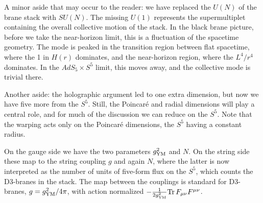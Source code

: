 \documentclass[12pt]{article}
\begin{document}
A minor aside that may occur to the reader: we have replaced the $U(N)$ of the brane stack with $SU(N)$.  The missing $U(1)$ represents the supermultiplet containing the overall collective motion of the stack.  In the black brane picture, before we take the near-horizon limit, this is a fluctuation of the spacetime geometry.  The mode is peaked in the transition region between flat spacetime, where the 1 in $H(r)$ dominates, and the near-horizon region, where the $L^4/r^4$ dominates.  In the $AdS_5 \times S^5$ limit, this moves away, and the collective mode is trivial there.

Another aside: the holographic argument led to one extra dimension, but now we have five more from the $S^5$.  Still, the Poincar\'e and radial dimensions will play a central role, and for much of the discussion we can reduce on the $S^5$.  Note that the warping acts only on the Poincar\'e dimensions, the $S^5$ having a constant radius.

On the gauge side we have the two parameters $g^2_{\rm YM}$ and $N$.  On the string side these map to the string coupling $g$ and again $N$, where the latter is now interpreted as the number of units of five-form flux on the $S^5$, which counts the D3-branes in the stack.  The map between the couplings is standard for D3-branes, $g = g_{\rm YM}^2/4\pi$, with action normalized $-\frac{1}{2g_{\rm YM}^2}{\rm Tr}\, F_{\mu\nu} F^{\mu\nu}$.  
\end{document}
